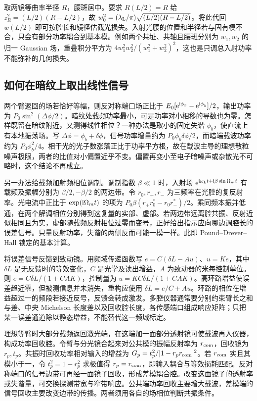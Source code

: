 取两镜等曲率半径 $R$，腰斑居中。要求 $R(L/2)=R$ 给 $z_R^2=(L/2)(R-L/2)$，故 $w_0^2=(\lambda_{\rm L}/\pi)\sqrt{(L/2)(R-L/2)}$。将此代回 $w(L/2)$ 即可按腔长和镜径估截光损失。入射光腰的位置和半径若与固有模不合，只会有部分功率耦合到基本模。例如两个共址、共轴且腰斑分别为 $w_1,w_2$ 的归一 Gaussian 场，重叠积分平方为 $4w_1^2w_2^2/(w_1^2+w_2^2)^2$，这也是只调总入射功率不能弥补的几何损失。

\subsection{如何在暗纹上取出线性信号}
两个臂返回的场若恰好等幅，则反对称端口场正比于 $E_0[\mathrm{e}^{\mathrm{i}\phi_x}-\mathrm{e}^{\mathrm{i}\phi_y}]/2$，输出功率为 $P_0\sin^2(\Delta\phi/2)$。暗纹处载频功率最小，可是功率对小相移的导数也为零。怎样既留在暗纹附近，又测得线性相位？一种办法是取小的固定失谐 $\phi_b$，使直流上有本地振荡场。写 $\Delta\phi=\phi_b+\delta\phi$，信号功率增量约为 $P_0\phi_b\delta\phi/2$，而暗端载波功率约为 $P_0\phi_b^2/4$。相干光的光子数涨落正比于功率平方根，故在载波主导的理想散粒噪声极限，两者的比值对小偏置近乎不变。偏置再变小至电子暗噪声或杂散光不可略时，这个结论不再成立。

另一办法给载频加射频相位调制。调制指数 $\beta\ll1$ 时，入射场 $\mathrm{e}^{\mathrm{i}\omega_{\rm L}t+\mathrm{i}\beta\sin\Omega_m t}$ 有载频及振幅分别为 $\beta/2,-\beta/2$ 的两边带。令 $r_0,r_+,r_-$ 为三频率在光腔的复反射率。光电流中正比于 $\exp(\mathrm{i}\Omega_m t)$ 的项为 $P_0\beta(r_+r_0^*-r_0r_-^*)/2$。乘同频本振并低通，在两个解调相位分别得到这复量的实部、虚部。若两边带远离腔共振、反射近似相同且为实，虚部随载频反射相位过零而变号，正好给出指示应向哪边调腔长的误差信号。只量反射功率，失谐的两侧反而可能一模一样。此即 Pound--Drever--Hall 锁定的基本计算。

将误差信号反馈到致动镜。用频域传递函数写 $e=C(\delta L-Au)$、$u=K e$，其中 $\delta L$ 是无反馈时的等效变化，$C$ 是光学及读出增益，$A$ 为致动器的米每控制单位。则 $e=C\delta L/(1+CAK)$，控制量为 $u=KC\delta L/(1+CAK)$。高环路增益使误差趋近零，但被测信息并未消失，重构应使用 $\delta L=e/C+Au$。环路的相位在增益超过一的频段若接近反号，反馈会转成激发。多腔仪器通常要分别约束臂长之和与差、中央 Michelson 长度差以及回收腔长度，各传感端口组成响应矩阵；只把某一误差通道除以静态增益，不能替代这一频域标定。

理想等臂时大部分载频返回激光端，在这端加一面部分透射镜可使载波再入仪器，构成功率回收腔。令臂与分光镜合起来对公共模的振幅反射率为 $r_{\rm com}$，回收镜为 $r_p,t_p$。共振时回收功率相对输入的增益为 $G_p=t_p^2/|1-r_p r_{\rm com}|^2$。若 $r_{\rm com}$ 实且其模小于一，令 $t_p^2=1-r_p^2$ 求极值得 $r_p=r_{\rm com}$，即输入耦合与等效损耗匹配。反对称端口的信号边带可再经一面镜子回收，形成差模耦合腔。改变这面镜子的透射率或失谐量，可交换探测带宽与窄带响应。公共端功率回收主要增大载波，差模端的信号回收主要改变边带的传播。两者须用各自的场相位判断共振条件。

